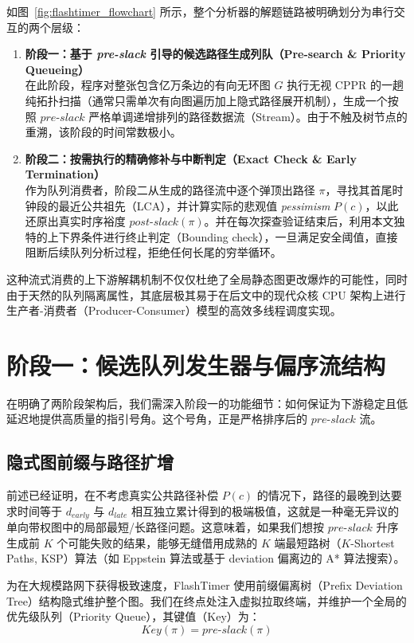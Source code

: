 如图~\ref{fig:flashtimer_flowchart} 所示，整个分析器的解题链路被明确划分为串行交互的两个层级：
\begin{enumerate}
    \item \textbf{阶段一：基于 \textit{pre-slack} 引导的候选路径生成列队（Pre-search \& Priority Queueing）} \\
    在此阶段，程序对整张包含亿万条边的有向无环图 $G$ 执行无视 CPPR 的一趟纯拓扑扫描（通常只需单次有向图遍历加上隐式路径展开机制），生成一个按照 $pre\text{-}slack$ 严格单调递增排列的路径数据流（Stream）。由于不触及树节点的重溯，该阶段的时间常数极小。
    \item \textbf{阶段二：按需执行的精确修补与中断判定（Exact Check \& Early Termination）} \\
    作为队列消费者，阶段二从生成的路径流中逐个弹顶出路径 $\pi$，寻找其首尾时钟段的最近公共祖先（LCA），并计算实际的悲观值 \textit{pessimism} $P(c)$，以此还原出真实时序裕度 $post\text{-}slack(\pi)$。并在每次探查验证结束后，利用本文独特的上下界条件进行终止判定（Bounding check），一旦满足安全阈值，直接阻断后续队列分析过程，拒绝任何长尾的穷举循环。
\end{enumerate}

这种流式消费的上下游解耦机制不仅仅杜绝了全局静态图更改爆炸的可能性，同时由于天然的队列隔离属性，其底层极其易于在后文中的现代众核 CPU 架构上进行生产者-消费者（Producer-Consumer）模型的高效多线程调度实现。

\section{阶段一：候选队列发生器与偏序流结构}
\label{sec:stage_one_generator}

在明确了两阶段架构后，我们需深入阶段一的功能细节：如何保证为下游稳定且低延迟地提供高质量的指引号角。这个号角，正是严格排序后的 $pre\text{-}slack$ 流。

\subsection{隐式图前缀与路径扩增}
前述已经证明，在不考虑真实公共路径补偿 $P(c)$ 的情况下，路径的最晚到达要求时间等于 $d_{early}$ 与 $d_{late}$ 相互独立累计得到的极端极值，这就是一种毫无异议的单向带权图中的局部最短/长路径问题。这意味着，如果我们想按 $pre\text{-}slack$ 升序生成前 $K$ 个可能失败的结果，能够无缝借用成熟的 $K$ 端最短路树（$K$-Shortest Paths, KSP）算法（如 Eppstein 算法或基于 deviation 偏离边的 A* 算法搜索）。

为在大规模路网下获得极致速度，FlashTimer 使用前缀偏离树（Prefix Deviation Tree）结构隐式维护整个图。我们在终点处注入虚拟拉取终端，并维护一个全局的优先级队列（Priority Queue），其键值（Key）为：
\begin{equation}
    Key(\pi) = pre\text{-}slack(\pi)
\end{equation}

